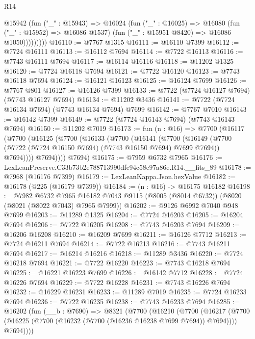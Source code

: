 \begin{lexlean}{R14}
\begin{coremodule}
              @15942
                (fun ("_" : @15943) =>
                @16024
                  (fun ("_" : @16025) =>
                  @16080
                    (fun ("_" : @15952) => @16086 @1537)
                    (fun ("_" : @15951 @8420) => @16086 @1050)))))))))
@16110 := @7767 @1315
@16111 := @16110 @7399
@16112 := @7724 @16111
@16113 := @16112 @7694
@16114 := @7722 @16113
@16116 := @7743 @16111 @7694
@16117 := @16114 @16116
@16118 := @11202 @1325
@16120 := @7724 @16118 @7694
@16121 := @7722 @16120
@16123 := @7743 @16118 @7694
@16124 := @16121 @16123
@16125 := @16124 @7699
@16126 := @7767 @801
@16127 := @16126 @7399
@16133 := @7722 (@7724 @16127 @7694) (@7743 @16127 @7694)
@16134 := @11202 @3436
@16141 := @7722 (@7724 @16134 @7694) (@7743 @16134 @7694) @7699
@16142 := @7767 @7010
@16143 := @16142 @7399
@16149 := @7722 (@7724 @16143 @7694) (@7743 @16143 @7694)
@16150 := @11202 @7019
@16173 := fun (n : @16) =>
  @7700
    (@16117
      (@7700
        (@16125
          (@7700
            (@16133
              (@7700
                (@16141
                  (@7700
                    (@16149
                      (@7700 (@7722 (@7724 @16150 @7694) (@7743 @16150 @7694) @7699 @7694))
                      @7694))))
              @7694))))
      @7694)
@16175 := @7959 @6732 @7965
@16176 := LexLeanPreserve.C33b73b2e788713990dfe94c58c97a86e.R14.__fits_89
@16178 := @7968 (@16176 @7399)
@16179 := LexLeanKappa.Json.hexValue
@16182 := @16178 (@225 (@16179 @7399))
@16184 := (n : @16) -> @16175 @16182
@16198 := @7982
    @6732
    @7965
    @16182
    @7043
    @9115
    (@8005 (@8014 @6732))
    (@8020 (@8021 (@8022 @7043) @7965 @7999))
@16202 := @9126 @6992 @7040 @948 @7699
@16203 := @11289 @1325
@16204 := @7724 @16203
@16205 := @16204 @7694
@16206 := @7722 @16205
@16208 := @7743 @16203 @7694
@16209 := @16206 @16208
@16210 := @16209 @7699
@16211 := @16126 @7712
@16213 := @7724 @16211 @7694
@16214 := @7722 @16213
@16216 := @7743 @16211 @7694
@16217 := @16214 @16216
@16218 := @11289 @3436
@16220 := @7724 @16218 @7694
@16221 := @7722 @16220
@16223 := @7743 @16218 @7694
@16225 := @16221 @16223 @7699
@16226 := @16142 @7712
@16228 := @7724 @16226 @7694
@16229 := @7722 @16228
@16231 := @7743 @16226 @7694
@16232 := @16229 @16231
@16233 := @11289 @7019
@16235 := @7724 @16233 @7694
@16236 := @7722 @16235
@16238 := @7743 @16233 @7694
@16285 := @16202
    (fun (__b : @7690) =>
    @8321
      (@7700
        (@16210
          (@7700
            (@16217
              (@7700 (@16225 (@7700 (@16232 (@7700 (@16236 @16238 @7699 @7694)) @7694))))
              @7694))))

\end{coremodule}
\end{lexlean}
